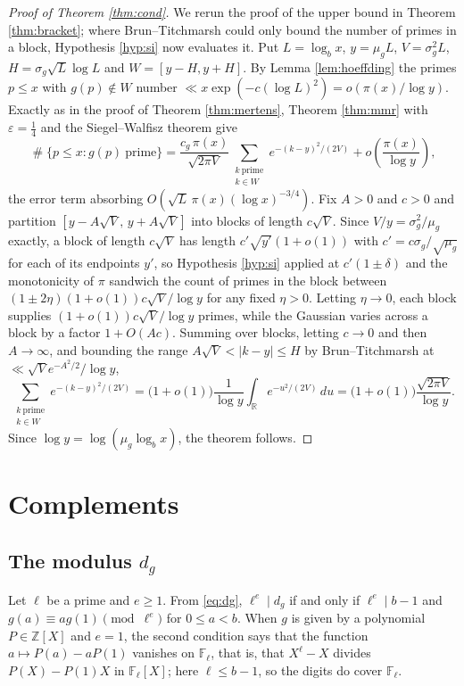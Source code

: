 \documentclass[11pt,reqno]{amsart}
\theoremstyle{plain}
\theoremstyle{definition}
\newcommand{\Z}{\mathbb{Z}}
\newcommand{\R}{\mathbb{R}}
\newcommand{\F}{\mathbb{F}}
\DeclareMathOperator{\Card}{\#}
\begin{document}
\begin{proof}[Proof of Theorem \ref{thm:cond}]
We rerun the proof of the upper bound in Theorem \ref{thm:bracket}; where Brun--Titchmarsh could only bound the number of primes in a block, Hypothesis \ref{hyp:si} now evaluates it. Put $L=\log_bx$, $y=\mu_gL$, $V=\sigma_g^{2}L$, $H=\sigma_g\sqrt L\log L$ and $W=[y-H,y+H]$. By Lemma \ref{lem:hoeffding} the primes $p\le x$ with $g(p)\notin W$ number $\ll x\exp(-c(\log L)^{2})=o(\pi(x)/\log y)$. Exactly as in the proof of Theorem \ref{thm:mertens}, Theorem \ref{thm:mmr} with $\varepsilon=\frac14$ and the Siegel--Walfisz theorem give
\[
\Card\{p\le x: g(p)\ \text{prime}\}=\frac{c_g\,\pi(x)}{\sqrt{2\pi V}}\sum_{\substack{k\ \text{prime}\\ k\in W}}e^{-(k-y)^{2}/(2V)}+o\!\left(\frac{\pi(x)}{\log y}\right),
\]
the error term absorbing $O(\sqrt L\,\pi(x)(\log x)^{-3/4})$. Fix $A>0$ and $c>0$ and partition $[y-A\sqrt V,\,y+A\sqrt V]$ into blocks of length $c\sqrt V$. Since $V/y=\sigma_g^{2}/\mu_g$ exactly, a block of length $c\sqrt V$ has length $c'\sqrt{y'}(1+o(1))$ with $c'=c\sigma_g/\sqrt{\mu_g}$ for each of its endpoints $y'$, so Hypothesis \ref{hyp:si} applied at $c'(1\pm\delta)$ and the monotonicity of $\pi$ sandwich the count of primes in the block between $(1\pm2\eta)(1+o(1))c\sqrt V/\log y$ for any fixed $\eta>0$. Letting $\eta\to0$, each block supplies $(1+o(1))c\sqrt V/\log y$ primes, while the Gaussian varies across a block by a factor $1+O(Ac)$. Summing over blocks, letting $c\to0$ and then $A\to\infty$, and bounding the range $A\sqrt V<|k-y|\le H$ by Brun--Titchmarsh at $\ll\sqrt Ve^{-A^{2}/2}/\log y$,
\[
\sum_{\substack{k\ \text{prime}\\ k\in W}}e^{-(k-y)^{2}/(2V)}=\big(1+o(1)\big)\frac{1}{\log y}\int_{\R}e^{-u^{2}/(2V)}\,du=\big(1+o(1)\big)\frac{\sqrt{2\pi V}}{\log y}.
\]
Since $\log y=\log(\mu_g\log_bx)$, the theorem follows.
\end{proof}

\section{Complements}

\subsection{The modulus \texorpdfstring{$d_g$}{d\_g}}\label{sec:modulus}
Let $\ell$ be a prime and $e\ge1$. From \eqref{eq:dg}, $\ell^e\mid d_g$ if and only if $\ell^e\mid b-1$ and $g(a)\equiv ag(1)\pmod{\ell^e}$ for $0\le a<b$. When $g$ is given by a polynomial $P\in\Z[X]$ and $e=1$, the second condition says that the function $a\mapsto P(a)-aP(1)$ vanishes on $\F_\ell$, that is, that $X^\ell-X$ divides $P(X)-P(1)X$ in $\F_\ell[X]$; here $\ell\le b-1$, so the digits do cover $\F_\ell$.
\end{document}
